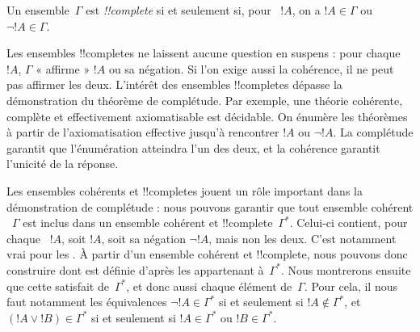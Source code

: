 \documentclass[../../../include/open-logic-section]{subfiles}
\begin{document}
      {}
      {}

{}
{}

\begin{defn}
 Un ensemble~$\Gamma$
 est
\emph{!!{complete}} si et seulement si, pour
~$!A$,
on a $!A\in\Gamma$ ou $\lnot !A\in\Gamma$.
\end{defn}

\begin{explain}
Les ensembles !!{complete}s  ne laissent aucune
question en suspens : pour chaque ~$!A$, $\Gamma$
« affirme » $!A$ ou sa négation. Si l'on exige aussi la cohérence, il
ne peut pas affirmer les deux. L'intérêt des ensembles !!{complete}s
dépasse la démonstration du théorème de complétude. Par exemple, une
théorie cohérente, complète et effectivement axiomatisable est
décidable. On énumère les théorèmes à partir de l'axiomatisation
effective jusqu'à rencontrer $!A$ ou $\lnot !A$. La complétude
garantit que l'énumération atteindra l'un des deux, et la cohérence
garantit l'unicité de la réponse.
\end{explain}

\begin{explain}
Les ensembles cohérents et !!{complete}s jouent un rôle important
dans la démonstration de complétude : nous pouvons garantir que tout
ensemble cohérent ~$\Gamma$ est inclus dans un
ensemble cohérent et !!{complete}~$\Gamma^*$. Celui-ci contient,
pour chaque ~$!A$, soit $!A$, soit sa négation
$\lnot !A$, mais non les deux. C'est notamment vrai pour les
.
À partir d'un ensemble cohérent et !!{complete}, nous pouvons donc construire
 dont
 est définie d'après les
appartenant à~$\Gamma^*$. Nous montrerons ensuite que cette
 satisfait 
de~$\Gamma^*$, et donc aussi chaque élément de~$\Gamma$.
Pour cela, il nous faut notamment les équivalences
$\lnot !A\in\Gamma^*$ si et seulement si
$!A\notin\Gamma^*$, et $(!A\lor !B)\in\Gamma^*$ si et seulement
si $!A\in\Gamma^*$ ou $!B\in\Gamma^*$.
\end{explain}
\end{document}
